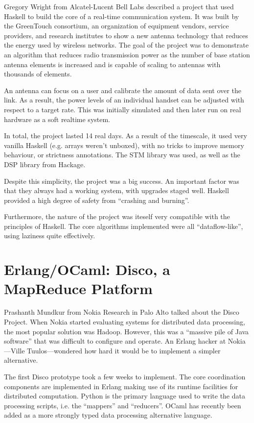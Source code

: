 \documentclass{jfp1}
\begin{document}
Gregory Wright from Alcatel-Lucent Bell Labs described a project that used
Haskell to build the core of a real-time communication system.  It was built by
the GreenTouch consortium, an organization of equipment vendors, service
providers, and research institutes to show a new antenna technology that
reduces the energy used by wireless networks.  The goal of the project was to
demonstrate an algorithm that reduces radio transmission power as the number of
base station antenna elements is increased and is capable of scaling to
antennas with thousands of elements.

An antenna can focus on a user and calibrate the amount of data sent over the
link. As a result, the power levels of an individual handset can be
adjusted with respect to a target rate.  This was initially simulated and then
later run on real hardware as a soft realtime system.

In total, the project lasted 14 real days. As a result of the timescale, it
used very vanilla Haskell (e.g. arrays weren't unboxed), with no tricks to
improve memory behaviour, or strictness annotations. The STM library was used,
as well as the DSP library from Hackage.

Despite this simplicity, the project was a big success. An important factor was
that they always had a working system, with upgrades staged well. Haskell
provided a high degree of safety from ``crashing and burning''.

Furthermore, the nature of the project was iteself very compatible with the
principles of Haskell. The core algorithms implemented were all
``dataflow-like'', using laziness quite effectively.

\section{Erlang/OCaml: Disco, a MapReduce Platform}

Prashanth Mundkur from Nokia Research in Palo Alto talked about the Disco
Project.  When Nokia started evaluating systems for distributed data
processing, the most popular solution was Hadoop. However, this was a ``massive
pile of Java software'' that was difficult to configure and operate. An Erlang
hacker at Nokia---Ville Tuulos---wondered how hard it would be to implement a
simpler alternative.

The first Disco prototype took a few weeks to implement. The core coordination
components are implemented in Erlang making use of its runtime facilities for
distributed computation. Python is the primary language used to write the data
processing scripts, i.e. the ``mappers'' and ``reducers''. OCaml has recently been
added as a more strongly typed data processing alternative language.
\end{document}
